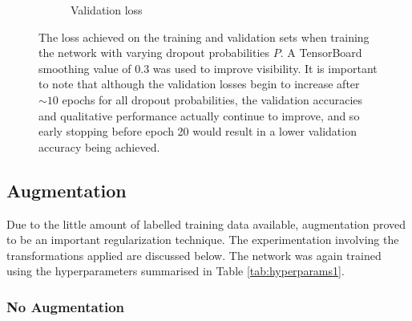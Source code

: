 \begin{figure}[t]
\begin{subfigure}[b]{0.49\textwidth}
        \caption{Validation loss}
    \end{subfigure}
    \caption{The loss achieved on the training and validation sets when training the network with varying dropout probabilities $P$. A TensorBoard smoothing value of 0.3 was used to improve visibility. It is important to note that although the validation losses begin to increase after ${\sim}10$ epochs for all dropout probabilities, the validation accuracies and qualitative performance actually continue to improve, and so early stopping before epoch 20 would result in a lower validation accuracy being achieved.}
    \label{fig:dropoutplots}
\end{figure}



\subsection{Augmentation}
\label{sec:evalaugmentation}

Due to the little amount of labelled training data available, augmentation proved to be an important regularization technique. The experimentation involving the transformations applied are discussed below. The network was again trained using the hyperparameters summarised in Table \ref{tab:hyperparams1}.

\subsubsection{No Augmentation}

